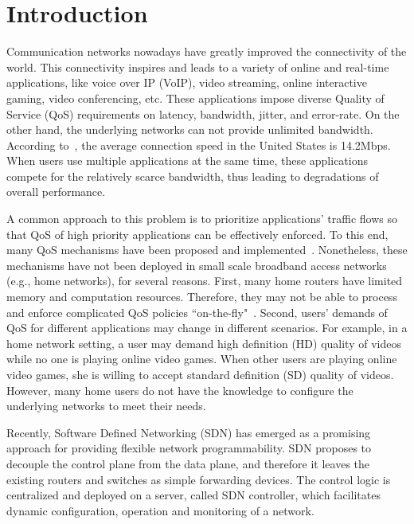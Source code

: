 \section{Introduction}
\label{sect:intro}

Communication networks nowadays have greatly improved the connectivity of the world. This connectivity
inspires and leads to a variety of online and real-time applications, like voice over IP (VoIP), video
streaming, online interactive gaming, video conferencing, etc. These applications impose diverse Quality
of Service (QoS) requirements on latency, bandwidth, jitter, and error-rate. On the other hand, the
underlying networks can not provide unlimited bandwidth. According to~\cite{akamai}, the average
connection speed in the United States is 14.2Mbps. When users use multiple applications at the same time,
these applications compete for the relatively scarce bandwidth, thus leading to degradations of overall
performance.

A common approach to this problem is to prioritize applications' traffic flows so that QoS of high
priority applications can be effectively enforced. To this end, many QoS mechanisms have been proposed and
implemented~\cite{Aurrecoechea_1998, Gozdecki_2003, McDysan_1999, meraki, PacketShaper}. Nonetheless, these mechanisms have not been deployed in small scale broadband
access networks (e.g., home networks), for several reasons. First, many home routers have limited memory and
computation resources. Therefore, they may not be able to process and enforce complicated QoS policies
``on-the-fly"~\cite{But_Comm2018}. Second, users' demands of QoS for different applications may change in different
scenarios. For example, in a home network setting, a user may demand high definition (HD) quality of videos while
no one is playing online video games. When other users are playing online video games, she is willing to accept
standard definition (SD) quality of videos. However, many home users do not have the knowledge to configure the
underlying networks to meet their needs.

Recently, Software Defined Networking (SDN) has emerged as a promising approach for providing flexible network
programmability. SDN proposes to decouple the control plane from the data plane, and therefore it leaves the
existing routers and switches as simple forwarding devices. The control logic is centralized and deployed on a
server, called SDN controller, which facilitates dynamic configuration, operation and monitoring of a network.

